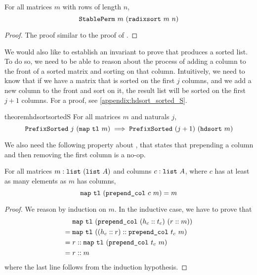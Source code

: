 \documentclass[sigplan,10pt,anonymous,review]{thesis}
\begin{document}
\begin{theorem}
  For all matrices $m$ with rows of length $n$,
  \begin{equation*}
    \texttt{\textup{StablePerm}}~m~(\texttt{\textup{radixsort}}~m~n)
  \end{equation*}
\end{theorem}
\begin{proof}
  The proof similar to the proof of .
\end{proof}

We would also like to establish an invariant to prove that
 produces a sorted list. To do so, we need to be able
to reason about the process of adding a column to the front of a
sorted matrix and sorting on that column. Intuitively, we need to know
that if we have a matrix that is sorted on the first $j$ columns, and
we add a new column to the front and sort on it, the result list will
be sorted on the first $j+1$ columns. For a proof, see
\cref{appendix:hdsort_sorted_S}.
\begin{restatable*}{theorem}{hdsortsortedS}
  For all matrices $m$ and naturals $j$,
  \begin{equation*}
    \texttt{\textup{PrefixSorted}}~j~(\texttt{\textup{map}}~\texttt{\textup{tl}}~m) \implies
    \texttt{\textup{PrefixSorted}}~(j+1)~(\texttt{\textup{hdsort}}~m)
  \end{equation*}
\end{restatable*}

We also need the following property about , that
states that prepending a column and then removing the first column is
a no-op.
\begin{theorem}
  For all matrices $m : \var{list}\ \allowbreak(\var{list}~A)$ and columns $c :
  \texttt{\textup{list}}~A$, where $c$ has at least as many elements as $m$ has columns,
  \begin{equation*}
      \texttt{\textup{map}}~\texttt{\textup{tl}}~(\texttt{\textup{prepend\_col}}~c~m) = m
  \end{equation*}
\end{theorem}
\begin{proof}
  We reason by induction on $m$. In the inductive case, we have to
  prove that
  \begin{align*}
    &\texttt{\textup{map}}~\texttt{\textup{tl}}~(\texttt{\textup{prepend\_col}}~(h_c :: t_c)~(r :: m)) \\
    ={}&\texttt{\textup{map}}~\texttt{\textup{tl}}~((h_c :: r) :: \texttt{\textup{prepend\_col}}~t_c~m) \\
    ={}&r :: \texttt{\textup{map}}~\texttt{\textup{tl}}~(\texttt{\textup{prepend\_col}}~t_c~m) \\
    ={}&r :: m
  \end{align*}
  where the last line follows from the induction hypothesis.
\end{proof}
\end{document}
